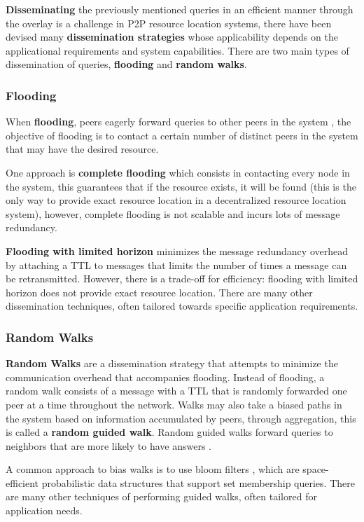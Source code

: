 \textbf{Disseminating} the previously mentioned queries in an efficient manner through the overlay is a challenge in P2P resource location systems, there have been devised many \textbf{dissemination strategies} whose applicability depends on the applicational requirements and system capabilities. There are two main types of dissemination of queries, \textbf{flooding} and \textbf{random walks}.

\subsubsection{Flooding}

When \textbf{flooding}, peers eagerly forward queries to other peers in the system , the objective of flooding is to contact a certain number of distinct peers in the system that may have the desired resource.

One approach is \textbf{complete flooding} which consists in contacting every node in the system, this guarantees that if the resource exists, it will be found (this is the only way to provide exact resource location in a decentralized resource location system), however, complete flooding is not scalable and incurs lots of message redundancy. 

\textbf{Flooding with limited horizon} minimizes the message redundancy overhead by attaching a TTL to messages that limits the number of times a message can be retransmitted. However, there is a trade-off for efficiency: flooding with limited horizon does not provide exact resource location. There are many other dissemination techniques, often tailored towards specific application requirements.

\subsubsection{Random Walks}

\textbf{Random Walks} are a dissemination strategy that attempts to minimize the communication overhead that accompanies flooding. Instead of flooding, a random walk consists of a message with a TTL that is randomly forwarded one peer at a time throughout the network. Walks may also take a biased paths in the system based on information accumulated by peers, through aggregation, this is called a \textbf{random guided walk}. Random guided walks  forward queries to neighbors that are more likely to have answers \cite{1022239}. 

A common approach to bias walks is to use bloom filters \cite{5751342}, which are space-efficient probabilistic data structures that support set membership queries. There are many other techniques of performing guided walks, often tailored for application needs.

